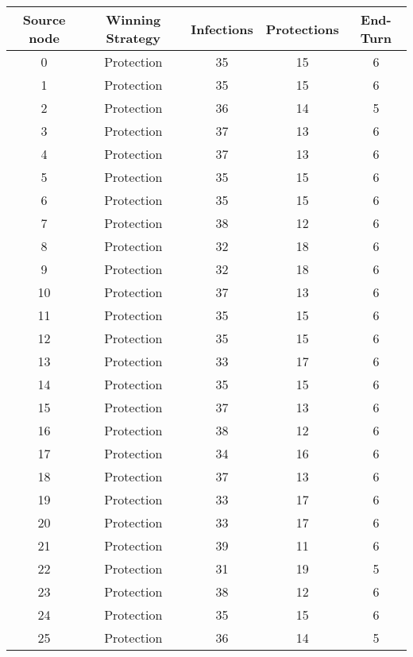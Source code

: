 \documentclass[results.tex]{subfiles}
\begin{document}
\begin{center}
  \begin{tabular}{| c || c | c | c | c |}
    \hline
    {\bfseries Source node} & {\bfseries Winning Strategy} & {\bfseries Infections} & {\bfseries Protections} & {\bfseries End-Turn} \\  %
    \hline\hline
    0 & Protection & 35 & 15 & 6 \\ 
    \hline
    1 & Protection & 35 & 15 & 6 \\ 
    \hline
    2 & Protection & 36 & 14 & 5 \\ 
    \hline
    3 & Protection & 37 & 13 & 6 \\ 
    \hline
    4 & Protection & 37 & 13 & 6 \\ 
    \hline
    5 & Protection & 35 & 15 & 6 \\ 
    \hline
    6 & Protection & 35 & 15 & 6 \\ 
    \hline
    7 & Protection & 38 & 12 & 6 \\ 
    \hline
    8 & Protection & 32 & 18 & 6 \\ 
    \hline
    9 & Protection & 32 & 18 & 6 \\ 
    \hline
    10 & Protection & 37 & 13 & 6 \\ 
    \hline
    11 & Protection & 35 & 15 & 6 \\ 
    \hline
    12 & Protection & 35 & 15 & 6 \\ 
    \hline
    13 & Protection & 33 & 17 & 6 \\ 
    \hline
    14 & Protection & 35 & 15 & 6 \\ 
    \hline
    15 & Protection & 37 & 13 & 6 \\ 
    \hline
    16 & Protection & 38 & 12 & 6 \\ 
    \hline
    17 & Protection & 34 & 16 & 6 \\ 
    \hline
    18 & Protection & 37 & 13 & 6 \\ 
    \hline
    19 & Protection & 33 & 17 & 6 \\ 
    \hline
    20 & Protection & 33 & 17 & 6 \\ 
    \hline
    21 & Protection & 39 & 11 & 6 \\ 
    \hline
    22 & Protection & 31 & 19 & 5 \\ 
    \hline
    23 & Protection & 38 & 12 & 6 \\ 
    \hline
    24 & Protection & 35 & 15 & 6 \\ 
    \hline
    25 & Protection & 36 & 14 & 5 \\ 

\end{tabular}
\end{center}
\end{document}
